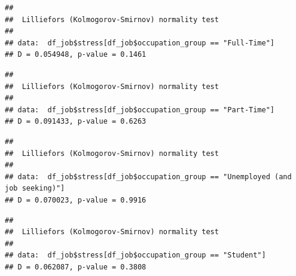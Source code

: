 \documentclass[
]{article}
\newenvironment{Shaded}{\begin{snugshade}}{\end{snugshade}}
\newcommand{\FunctionTok}[1]{\textcolor[rgb]{0.13,0.29,0.53}{\textbf{#1}}}
\newcommand{\NormalTok}[1]{#1}
\newcommand{\SpecialCharTok}[1]{\textcolor[rgb]{0.81,0.36,0.00}{\textbf{#1}}}
\newcommand{\StringTok}[1]{\textcolor[rgb]{0.31,0.60,0.02}{#1}}
\begin{document}
\begin{verbatim}
## 
##  Lilliefors (Kolmogorov-Smirnov) normality test
## 
## data:  df_job$stress[df_job$occupation_group == "Full-Time"]
## D = 0.054948, p-value = 0.1461
\end{verbatim}

\begin{Shaded}
\end{Shaded}

\begin{verbatim}
## 
##  Lilliefors (Kolmogorov-Smirnov) normality test
## 
## data:  df_job$stress[df_job$occupation_group == "Part-Time"]
## D = 0.091433, p-value = 0.6263
\end{verbatim}

\begin{Shaded}
\end{Shaded}

\begin{verbatim}
## 
##  Lilliefors (Kolmogorov-Smirnov) normality test
## 
## data:  df_job$stress[df_job$occupation_group == "Unemployed (and job seeking)"]
## D = 0.070023, p-value = 0.9916
\end{verbatim}

\begin{Shaded}
\end{Shaded}

\begin{verbatim}
## 
##  Lilliefors (Kolmogorov-Smirnov) normality test
## 
## data:  df_job$stress[df_job$occupation_group == "Student"]
## D = 0.062087, p-value = 0.3808
\end{verbatim}
\end{document}
